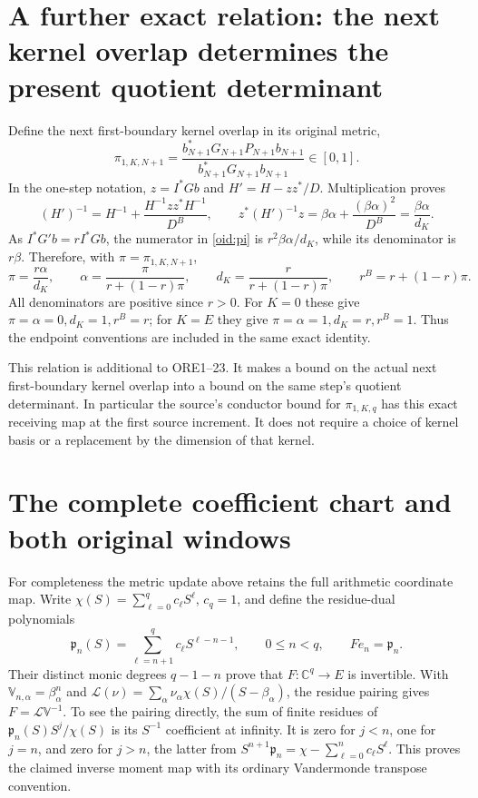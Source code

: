 \documentclass[11pt,a4paper]{article}
\newcommand{\C}{\mathbb C}
\begin{document}
\section{A further exact relation: the next kernel overlap determines
the present quotient determinant}

Define the next first-boundary kernel overlap in its original metric,
\begin{equation}\label{oid:pi}
 \pi_{1,K,N+1}
 =\frac{b_{N+1}^*G_{N+1}P_{N+1}b_{N+1}}
 {b_{N+1}^*G_{N+1}b_{N+1}}\in[0,1].
\end{equation}
In the one-step notation, $z=I^*Gb$ and
$H'=H-zz^*/D$. Multiplication proves
\[
 (H')^{-1}=H^{-1}
 +\frac{H^{-1}zz^*H^{-1}}{D^B},\qquad
 z^*(H')^{-1}z
 =\beta\alpha+\frac{(\beta\alpha)^2}{D^B}
 =\frac{\beta\alpha}{d_K}.
\]
As $I^*G'b=rI^*Gb$, the numerator in \eqref{oid:pi} is
$r^2\beta\alpha/d_K$, while its denominator is $r\beta$.
Therefore, with $\pi=\pi_{1,K,N+1}$,
\begin{equation}\label{oid:newallocation}
 \boxed{\pi=\frac{r\alpha}{d_K},\qquad
 \alpha=\frac{\pi}{r+(1-r)\pi},\qquad
 d_K=\frac r{r+(1-r)\pi},\qquad
 r^B=r+(1-r)\pi.}
\end{equation}
All denominators are positive since $r>0$. For $K=0$ these give
$\pi=\alpha=0,d_K=1,r^B=r$; for $K=E$ they give
$\pi=\alpha=1,d_K=r,r^B=1$. Thus the endpoint conventions are
included in the same exact identity.

This relation is additional to ORE1--23. It makes a bound on the
actual next first-boundary kernel overlap into a bound on the same
step's quotient determinant. In particular the source's conductor
bound for $\pi_{1,K,q}$ has this exact receiving map at the first
source increment. It does not require a choice of kernel basis or a
replacement by the dimension of that kernel.

\section{The complete coefficient chart and both original windows}

For completeness the metric update above retains the full arithmetic
coordinate map. Write $\chi(S)=\sum_{\ell=0}^qc_\ell S^\ell$,
$c_q=1$, and define the residue-dual polynomials
\[
 \mathfrak p_n(S)=\sum_{\ell=n+1}^qc_\ell S^{\ell-n-1},
 \qquad 0\le n<q,
 \qquad F e_n=\mathfrak p_n.
\]
Their distinct monic degrees $q-1-n$ prove that $F:\C^q\to E$
is invertible. With $\mathbb V_{n,\alpha}=\beta_\alpha^n$ and
$\mathcal L(\nu)=\sum_\alpha\nu_\alpha\chi(S)/(S-\beta_\alpha)$,
the residue pairing gives $F=\mathcal L\mathbb V^{-1}$. To see the
pairing directly, the sum of finite residues of
$\mathfrak p_n(S)S^j/\chi(S)$ is its $S^{-1}$ coefficient at infinity.
It is zero for $j<n$, one for $j=n$, and zero for $j>n$, the latter
from
$S^{n+1}\mathfrak p_n=\chi-\sum_{\ell=0}^nc_\ell S^\ell$.
This proves the claimed inverse moment map with its ordinary
Vandermonde transpose convention.
\end{document}
